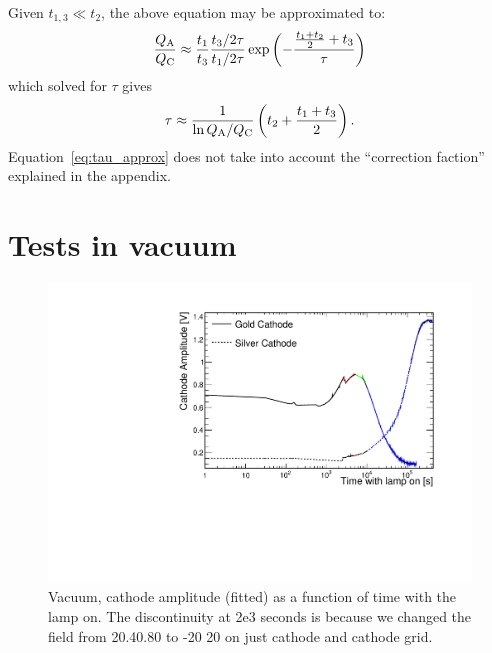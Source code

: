 \documentclass[a4paper,11pt]{article}
\begin{document}
Given $t_{1,3} \ll t_2$, the above equation may be approximated to:
\begin{equation}
    \frac{Q_{\rm A}}{Q_{\rm C}} \approx \frac{t_1}{t_3} 
    \frac{t_3/2\tau}{t_1/2\tau}
    \exp{\left(-\frac{\frac{t_1+t_2}{2}+t_3}{\tau}\right)}
\end{equation}
 which solved for $\tau$ gives
\begin{equation}
    \tau \approx \frac{1}{\ln{Q_{\rm A}/Q_{\rm C}}}\left ( t_2 + \frac{t_1+t_3}{2}\right).
    \label{eq:tau_approx}
\end{equation}
Equation~\ref{eq:tau_approx} does not take into account the ``correction faction'' explained in the appendix. 

\section{Tests in vacuum}
\begin{figure}[t]
    \centering
    \includegraphics[width=.8\linewidth]{figures/SilverAndGoldVStime.pdf}
    \caption{Vacuum, cathode amplitude (fitted) as a function of time with the lamp on. The discontinuity at 2e3 seconds is because we changed the field from 20.40.80 to -20 20 on just cathode and cathode grid.}
    \label{fig:silver_gold_over_time}
\end{figure}
\end{document}
